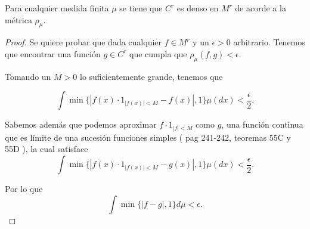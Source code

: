 \begin{lema}
    Para cualquier medida finita $\mu$ se tiene que $C^r$ es denso en 
    $M^r$ de acorde a la métrica $\rho_\mu$.
\end{lema}
\begin{proof}
    Se quiere probar que dada cualquier $f \in M^r$ y un $\epsilon > 0$ arbitrario. 
    Tenemos que encontrar una función $g \in C^r$ que cumpla que 
    $\rho_{\mu}(f, g) < \epsilon$. 

    Tomando un $M > 0$ lo suficientemente grande, tenemos que 
    
    \begin{equation}
        \int \min \{ |f(x)\cdot 1_{|f(x)| < M} - f(x)|, 1\} \mu(dx) 
        < \frac{\epsilon}{2}. 
    \end{equation}

    Sabemos además que podemos aproximar $f\cdot 1_{|f| < M}$ como $g$, una función continua que es límite de una sucesión 
    funciones simples ( pag 241-242,  teoremas 55C y 55D \cite{nla.cat-vn1819421}), 
    la cual satisface 
    \begin{equation}
        \int \min \{ |f(x)\cdot 1_{|f(x)| < M} - g(x)|, 1\} \mu(dx) 
        < \frac{\epsilon}{2}. 
    \end{equation}

     Por lo que 
     \begin{equation}
        \int \min \{ |f  - g|, 1\} d\mu 
        < \epsilon. 
    \end{equation}
\end{proof}








